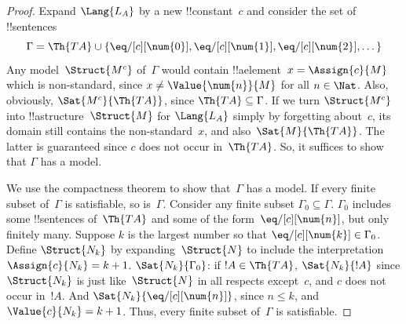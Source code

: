 \documentclass[../../../include/open-logic-section]{subfiles}
\begin{document}
\begin{proof}
Expand $\Lang{L_A}$ by a new !!{constant}~$c$ and consider the set of
!!{sentence}s
\[
\Gamma = \Th{TA} \cup \{\eq/[c][\num{0}], \eq/[c][\num{1}],
\eq/[c][\num{2}], \dots\}
\]
Any model~$\Struct{M^c}$ of~$\Gamma$ would contain !!a{element}~$x =
\Assign{c}{M}$ which is non-standard, since $x \neq
\Value{\num{n}}{M}$ for all $n \in \Nat$. Also, obviously,
$\Sat{M^c}{\Th{TA}}$, since $\Th{TA} \subseteq \Gamma$. If we turn
$\Struct{M^c}$ into !!a{structure}~$\Struct{M}$ for $\Lang{L_A}$
simply by forgetting about~$c$, its domain still contains the
non-standard~$x$, and also~$\Sat{M}{\Th{TA}}$. The latter is
guaranteed since $c$ does not occur in~$\Th{TA}$. So, it suffices to
show that $\Gamma$ has a model.

We use the compactness theorem to show that~$\Gamma$ has a model. If
every finite subset of~$\Gamma$ is satisfiable, so
is~$\Gamma$. Consider any finite subset $\Gamma_0 \subseteq
\Gamma$. $\Gamma_0$ includes some !!{sentence}s of~$\Th{TA}$ and some
of the form~$\eq/[c][\num{n}]$, but only finitely many. Suppose $k$ is
the largest number so that $\eq/[c][\num{k}] \in \Gamma_0$. Define
$\Struct{N_k}$ by expanding~$\Struct{N}$ to include the
interpretation~$\Assign{c}{N_k} = k+1$. $\Sat{N_k}{\Gamma_0}$: if $!A
\in \Th{TA}$, $\Sat{N_k}{!A}$ since $\Struct{N_k}$ is just
like~$\Struct{N}$ in all respects except~$c$, and $c$ does not occur
in~$!A$. And $\Sat{N_k}{\eq/[c][\num{n}]}$, since $n \le k$, and
$\Value{c}{N_k} = k+1$. Thus, every finite subset of~$\Gamma$ is
satisfiable.
\end{proof}
\end{document}
